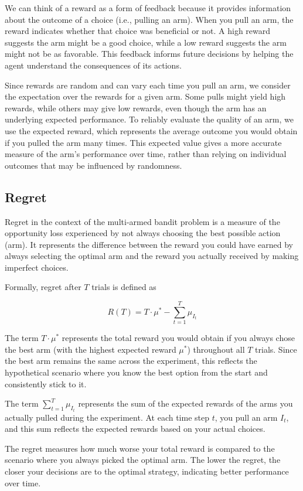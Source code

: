 We can think of a reward as a form of feedback because it provides information about the outcome of a choice (i.e., pulling an arm). When you pull an arm, the reward indicates whether that choice was beneficial or not. A high reward suggests the arm might be a good choice, while a low reward suggests the arm might not be as favorable. This feedback informs future decisions by helping the agent understand the consequences of its actions.

Since rewards are random and can vary each time you pull an arm, we consider the expectation over the rewards for a given arm. Some pulls might yield high rewards, while others may give low rewards, even though the arm has an underlying expected performance. To reliably evaluate the quality of an arm, we use the expected reward, which represents the average outcome you would obtain if you pulled the arm many times. This expected value gives a more accurate measure of the arm's performance over time, rather than relying on individual outcomes that may be influenced by randomness.

\subsection{Regret}

Regret in the context of the multi-armed bandit problem is a measure of the opportunity loss experienced by not always choosing the best possible action (arm).
It represents the difference between the reward you could have earned by always selecting the optimal arm and the reward you actually received by making imperfect choices.

Formally, regret after $T$ trials is defined as

$$
    R(T) = T \cdot \mu^* - \sum_{t=1}^{T} \mu_{I_t}
$$

\begin{tipbox}

    The term $T \cdot \mu^*$ represents the total reward you would obtain if you always chose the best arm (with the highest expected reward $\mu^*$) throughout all $T$ trials. Since the best arm remains the same across the experiment, this reflects the hypothetical scenario where you know the best option from the start and consistently stick to it.

    The term $\sum_{t=1}^{T} \mu_{I_t}$ represents the sum of the expected rewards of the arms you actually pulled during the experiment. At each time step $t$, you pull an arm $I_t$, and this sum reflects the expected rewards based on your actual choices.

    The regret measures how much worse your total reward is compared to the scenario where you always picked the optimal arm. The lower the regret, the closer your decisions are to the optimal strategy, indicating better performance over time.
\end{tipbox}

